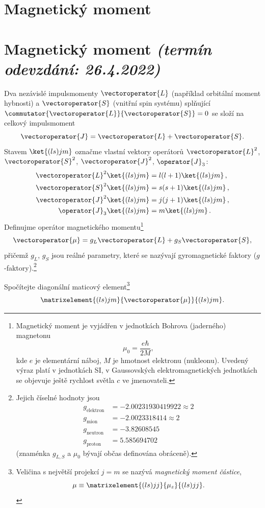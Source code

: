 \documentclass[a4paper,11pt,twoside]{book}
\def\np{\newpage}
\newcommand{\exercise}[2][]{\ifthenelse{\isempty{#1}}
	{\np\section{#2}}
	{\np\section[#2]{{#2} \small{\it{(termín odevzdání: {#1})}}}}
}
\begin{document}
    \exercise[26.4.2022]{Magnetický moment}
	Dva nezávislé impulsmomenty $\vectoroperator{L}$ (například orbitální moment hybnosti) a $\vectoroperator{S}$ (vnitřní spin systému) splňující $\commutator{\vectoroperator{L}}{\vectoroperator{S}}=0$ se složí na celkový impulsmoment
	\begin{equation*}
		\vectoroperator{J}=\vectoroperator{L}+\vectoroperator{S}.
	\end{equation*}
	Stavem $\ket{(ls)jm}$ označme vlastní vektory operátorů $\vectoroperator{L}^{2}$, $\vectoroperator{S}^{2}$, $\vectoroperator{J}^{2}$, $\operator{J}_{3}$:
	\begin{align*}
		\vectoroperator{L}^{2}\ket{(ls)jm}&=l(l+1)\ket{(ls)jm}\,,\\
		\vectoroperator{S}^{2}\ket{(ls)jm}&=s(s+1)\ket{(ls)jm}\,,\\
		\vectoroperator{J}^{2}\ket{(ls)jm}&=j(j+1)\ket{(ls)jm}\,,\\
		\operator{J}_{3}\ket{(ls)jm}&=m\ket{(ls)jm}\,.
		\label{eq:lsev}
	\end{align*}
	Definujme operátor magnetického momentu\footnote{
		Magnetický moment je vyjádřen v jednotkách Bohrova (jaderného) magnetonu
		\begin{equation*}
			\mu_{0}=\frac{e\hbar}{2M},
		\end{equation*}
		kde $e$ je elementární náboj, $M$ je hmotnost elektronu (nukleonu).
		Uvedený výraz platí v jednotkách SI, v Gaussovských elektromagnetických jednotkách se objevuje ještě rychlost světla $c$ ve jmenovateli.
	}
	\begin{equation*}
		\vectoroperator{\mu}=g_{L}\vectoroperator{L}+g_{S}\vectoroperator{S},
	\end{equation*}
	přičemž $g_{L}$, $g_{S}$ jsou reálné parametry, které se nazývají gyromagnetické faktory ($g$-faktory).\footnote{
		Jejich číselné hodnoty jsou
		\begin{align*}
			g_{\mathrm{elektron}}&=-2.00231930419922\approx2 \\
			g_{\mathrm{mion}}&=-2.0023318414\approx2 \\
			g_{\mathrm{neutron}}&=-3.82608545\\
			g_{\mathrm{proton}}&=5.585694702
		\end{align*}
		(znaménka $g_{L,S}$ a $\mu_{0}$ bývají občas definována obráceně).
	}

	Spočítejte diagonální maticový element\footnote{
		Veličina s největší projekcí $j=m$ se nazývá \emph{magnetický moment částice},
		\begin{equation*}
			\mu\equiv\matrixelement{(ls)jj}{\mu_{z}}{(ls)jj}.
		\end{equation*}
	}
	\begin{equation*}
		\matrixelement{(ls)jm}{\vectoroperator{\mu}}{(ls)jm}.
	\end{equation*}
	    
\end{document}
